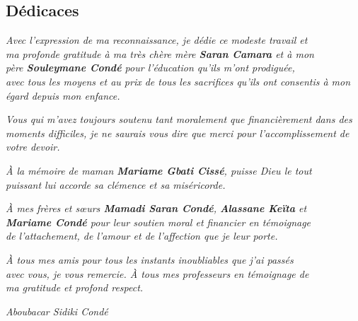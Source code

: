 \documentclass[11pt,a4paper]{article}
\begin{document}
\newpage
{} %
\setcounter{page}{2}

\newpage
\begin{center}
\section*{Dédicaces}
\Large
\textit{%
Avec l’expression de ma reconnaissance, je dédie ce modeste travail et\\
ma profonde gratitude à ma très chère mère \textbf{Saran Camara} et à mon\\
père \textbf{Souleymane Condé} pour l’éducation qu’ils m’ont prodiguée,\\
avec tous les moyens et au prix de tous les sacrifices qu’ils ont consentis à mon égard depuis mon enfance.}

\textit{Vous qui m’avez toujours soutenu tant moralement que financièrement dans des moments difficiles, je ne saurais vous dire que merci pour l’accomplissement de votre devoir.\\[1em]}

\textit{À la mémoire de maman \textbf{Mariame Gbati Cissé}, puisse Dieu le tout\\
puissant lui accorde sa clémence et sa miséricorde.\\[1em]}

\textit{À mes frères et sœurs \textbf{Mamadi Saran Condé}, \textbf{Alassane Keïta} et\\
\textbf{Mariame Condé} pour leur soutien moral et financier en témoignage\\
de l’attachement, de l’amour et de l’affection que je leur porte.\\[1em]}

\textit{À tous mes amis pour tous les instants inoubliables que j’ai passés\\
avec vous, je vous remercie. À tous mes professeurs en témoignage de\\
ma gratitude et profond respect.}

\vspace{2cm}

\begin{flushright}
\Large
\textit{Aboubacar Sidiki Condé}
\end{flushright}
\end{center}
\end{document}
